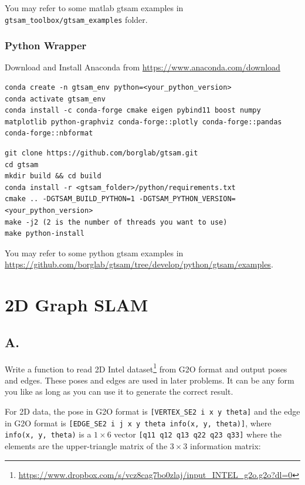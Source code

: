 \documentclass[tp]{lcc}
\begin{document}
You may refer to some matlab gtsam examples in \lstinline[style=bash]{gtsam_toolbox/gtsam_examples} folder.

\subsubsection*{Python Wrapper}

Download and Install Anaconda from \url{https://www.anaconda.com/download}

\begin{lstlisting}[style=bash] 
conda create -n gtsam_env python=<your_python_version>
conda activate gtsam_env
conda install -c conda-forge cmake eigen pybind11 boost numpy matplotlib python-graphviz conda-forge::plotly conda-forge::pandas conda-forge::nbformat
\end{lstlisting}

\begin{lstlisting}[style=bash] 
git clone https://github.com/borglab/gtsam.git
cd gtsam
mkdir build && cd build
conda install -r <gtsam_folder>/python/requirements.txt
cmake .. -DGTSAM_BUILD_PYTHON=1 -DGTSAM_PYTHON_VERSION=<your_python_version>
make -j2 (2 is the number of threads you want to use)
make python-install
\end{lstlisting}

You may refer to some python gtsam examples in \url{https://github.com/borglab/gtsam/tree/develop/python/gtsam/examples}.

\section{2D Graph SLAM}
\subsection{A.}
Write a function to read 2D Intel dataset\footnote{\url{https://www.dropbox.com/s/vcz8cag7bo0zlaj/input_INTEL_g2o.g2o?dl=0}} from G2O format and output poses and edges. These poses and edges are used in later problems. It can be any form you like as long as you can use it to generate the correct result.

For 2D data, the pose in G2O format is \lstinline[style=bash]{[VERTEX_SE2 i x y theta]} and the edge in G2O format is \lstinline[style=bash]{[EDGE_SE2 i j x y theta info(x, y, theta)]}, where \lstinline[style=bash]{info(x, y, theta)} is a $1 \times 6$ vector \lstinline[style=bash]{[q11 q12 q13 q22 q23 q33]} where the elements are the upper-triangle matrix of the $3 \times 3$ information matrix:
\end{document}
